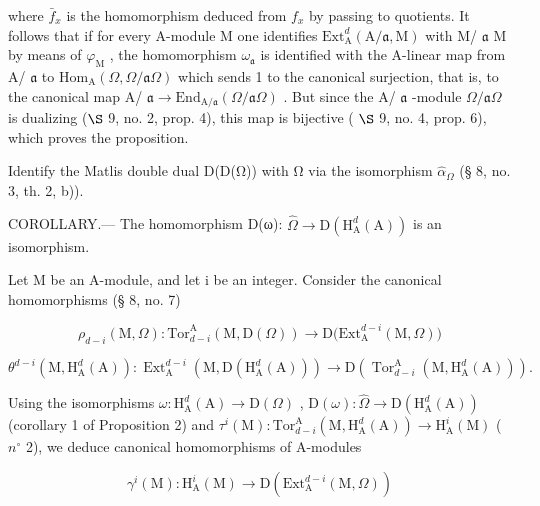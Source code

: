 where \(\bar{f}_x\) is the homomorphism deduced from \(f_x\) by passing to quotients. It follows that if for every A-module M one identifies \(\mathrm{Ext}_{\mathrm{A}}^{d}(\mathrm{A}/\mathfrak{a},\mathrm{M})\) with M/ \(\mathfrak{a}\) M by means of \(\varphi_{\mathrm{M}}\) , the homomorphism \(\omega_{\mathfrak{a}}\) is identified with the A-linear map from A/ \(\mathfrak{a}\) to \(\mathrm{Hom}_{\mathrm{A}}(\Omega,\Omega/\mathfrak{a}\Omega)\) which sends 1 to the canonical surjection, that is, to the canonical map A/ \(\mathfrak{a}\longrightarrow\mathrm{End}_{\mathrm{A}/\mathfrak{a}}(\Omega/\mathfrak{a}\Omega)\) . But since the A/ \(\mathfrak{a}\) -module \(\Omega/\mathfrak{a}\Omega\) is dualizing (\(\S\) 9, no. 2, prop. 4), this map is bijective ( \(\S\) 9, no. 4, prop. 6), which proves the proposition.

Identify the Matlis double dual D(D(Ω)) with Ω via the isomorphism \(\widehat{\alpha}_{\Omega}\) (§ 8, no. 3, th. 2, b)).

COROLLARY.--- The homomorphism D(ω): \(\widehat{\Omega} \rightarrow \mathrm{D}(\mathrm{H}_{\mathrm{A}}^{d}(\mathrm{A}))\) is an isomorphism.

Let M be an A-module, and let i be an integer. Consider the canonical homomorphisms (§ 8, no. 7)

\[
\rho_ {d - i} (\mathrm{M}, \Omega): \mathrm{Tor} _ {d - i} ^ {\mathrm{A}} (\mathrm{M}, \mathrm{D} (\Omega)) \longrightarrow \mathrm{D} \big (\mathrm{Ext} _ {\mathrm{A}} ^ {d - i} (\mathrm{M}, \Omega) \big)
\]

\[
\theta^ {d - i} (\mathrm{M}, \mathrm{H} _ {\mathrm{A}} ^ {d} (\mathrm{A})): \operatorname{Ext} _ {\mathrm{A}} ^ {d - i} \left(\mathrm{M}, \mathrm{D} \left(\mathrm{H} _ {\mathrm{A}} ^ {d} (\mathrm{A})\right)\right) \longrightarrow \mathrm{D} \left(\operatorname{Tor} _ {d - i} ^ {\mathrm{A}} \left(\mathrm{M}, \mathrm{H} _ {\mathrm{A}} ^ {d} (\mathrm{A})\right)\right).
\]

Using the isomorphisms \(\omega : \mathrm{H}_{\mathrm{A}}^{d}(\mathrm{A}) \to \mathrm{D}(\Omega)\) , \(\mathrm{D}(\omega) : \widehat{\Omega} \to \mathrm{D}(\mathrm{H}_{\mathrm{A}}^{d}(\mathrm{A}))\) (corollary 1 of Proposition 2) and \(\tau^{i}(\mathrm{M}) : \mathrm{Tor}_{d-i}^{\mathrm{A}}(\mathrm{M}, \mathrm{H}_{\mathrm{A}}^{d}(\mathrm{A})) \longrightarrow \mathrm{H}_{\mathrm{A}}^{i}(\mathrm{M})\) ( \(n^{\circ}\) 2), we deduce canonical homomorphisms of A-modules

\[
\gamma^ {i} (\mathrm{M}): \mathrm{H} _ {\mathrm{A}} ^ {i} (\mathrm{M}) \longrightarrow \mathrm{D} \left(\mathrm{Ext} _ {\mathrm{A}} ^ {d - i} (\mathrm{M}, \Omega)\right)
\]

